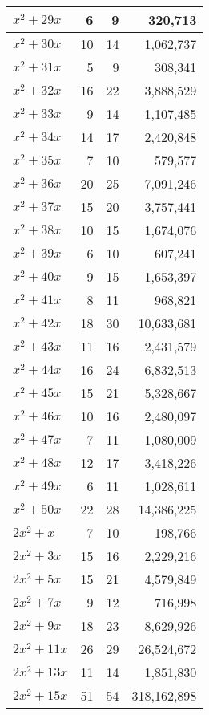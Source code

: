 \documentclass[a4paper]{amsproc}
\theoremstyle{plain}
\begin{document}
\begin{longtable}{ | l | r | r | r | }
$x^2 + 29x$ & 6 & 9 & 320{,}713 \\ \hline
$x^2 + 30x$ & 10 & 14 & 1{,}062{,}737 \\ \hline
$x^2 + 31x$ & 5 & 9 & 308{,}341 \\ \hline
$x^2 + 32x$ & 16 & 22 & 3{,}888{,}529 \\ \hline
$x^2 + 33x$ & 9 & 14 & 1{,}107{,}485 \\ \hline
$x^2 + 34x$ & 14 & 17 & 2{,}420{,}848 \\ \hline
$x^2 + 35x$ & 7 & 10 & 579{,}577 \\ \hline
$x^2 + 36x$ & 20 & 25 & 7{,}091{,}246 \\ \hline
$x^2 + 37x$ & 15 & 20 & 3{,}757{,}441 \\ \hline
$x^2 + 38x$ & 10 & 15 & 1{,}674{,}076 \\ \hline
$x^2 + 39x$ & 6 & 10 & 607{,}241 \\ \hline
$x^2 + 40x$ & 9 & 15 & 1{,}653{,}397 \\ \hline
$x^2 + 41x$ & 8 & 11 & 968{,}821 \\ \hline
$x^2 + 42x$ & 18 & 30 & 10{,}633{,}681 \\ \hline
$x^2 + 43x$ & 11 & 16 & 2{,}431{,}579 \\ \hline
$x^2 + 44x$ & 16 & 24 & 6{,}832{,}513 \\ \hline
$x^2 + 45x$ & 15 & 21 & 5{,}328{,}667 \\ \hline
$x^2 + 46x$ & 10 & 16 & 2{,}480{,}097 \\ \hline
$x^2 + 47x$ & 7 & 11 & 1{,}080{,}009 \\ \hline
$x^2 + 48x$ & 12 & 17 & 3{,}418{,}226 \\ \hline
$x^2 + 49x$ & 6 & 11 & 1{,}028{,}611 \\ \hline
$x^2 + 50x$ & 22 & 28 & 14{,}386{,}225 \\ \hline
$2x^2 + x$ & 7 & 10 & 198{,}766 \\ \hline
$2x^2 + 3x$ & 15 & 16 & 2{,}229{,}216 \\ \hline
$2x^2 + 5x$ & 15 & 21 & 4{,}579{,}849 \\ \hline
$2x^2 + 7x$ & 9 & 12 & 716{,}998 \\ \hline
$2x^2 + 9x$ & 18 & 23 & 8{,}629{,}926 \\ \hline
$2x^2 + 11x$ & 26 & 29 & 26{,}524{,}672 \\ \hline
$2x^2 + 13x$ & 11 & 14 & 1{,}851{,}830 \\ \hline
$2x^2 + 15x$ & 51 & 54 & 318{,}162{,}898 \\ \hline

\end{longtable}
\end{document}
